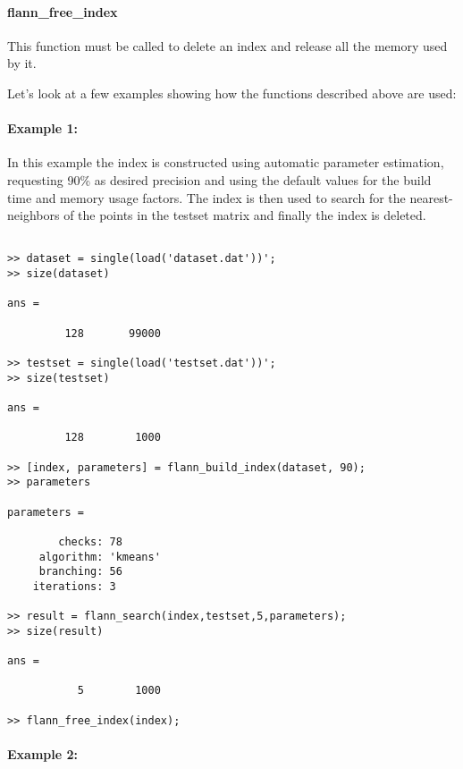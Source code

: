 \documentclass[letter,10pt]{article}
\begin{document}
\paragraph{flann\_free\_index}

This function must be called to delete an index and release all the memory used by it.

\bigskip

Let's look at a few examples showing how the functions described above are used:

\paragraph{Example 1:}

In this example the index is constructed using automatic parameter estimation, requesting 90\% as desired precision and using the default values for the build time and memory usage factors. The index is then used to search for the nearest-neighbors of the points in the testset matrix and finally the index is deleted.

\begin{Verbatim}[fontsize=\footnotesize,frame=single]

>> dataset = single(load('dataset.dat'))';
>> size(dataset)

ans =

         128       99000

>> testset = single(load('testset.dat'))';
>> size(testset)

ans =

         128        1000

>> [index, parameters] = flann_build_index(dataset, 90);
>> parameters

parameters = 

        checks: 78
     algorithm: 'kmeans'
     branching: 56
    iterations: 3

>> result = flann_search(index,testset,5,parameters);
>> size(result)

ans =

           5        1000

>> flann_free_index(index);

\end{Verbatim}




% 
% 


\paragraph{Example 2:}
\end{document}
